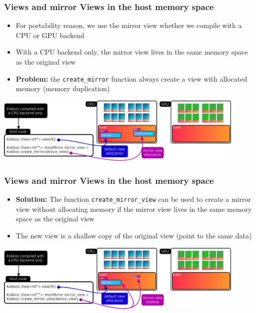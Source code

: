 \documentclass[aspectratio=169]{beamer}
\begin{document}

\begin{frame}[fragile]
    \frametitle{Views and mirror Views in the host memory space}

\begin{itemize}
\item For portability reason, we use the mirror view whether we compile with a CPU or GPU backend
\item With a CPU backend only, the mirror view lives in the same memory space as the original view
\item \textbf{Problem:} the \texttt{create\_mirror} function always create a view with allocated memory (memory duplication)
\end{itemize}

\begin{center}
    \includegraphics[width=0.9\textwidth]{../../images/host_mirror_view.png}
\end{center}

\end{frame}



\begin{frame}[fragile]
    \frametitle{Views and mirror Views in the host memory space}

\begin{itemize}
    \item \textbf{Solution:} The function \texttt{create\_mirror\_view} can be used to create a mirror view without allocating memory if the mirror view lives in the same memory space as the original view
    \item The new view is a shallow copy of the original view (point to the same data)
\end{itemize}

\begin{center}
    \includegraphics[width=0.9\textwidth]{../../images/host_create_mirror_view.png}
\end{center}

\end{frame}
\end{document}

